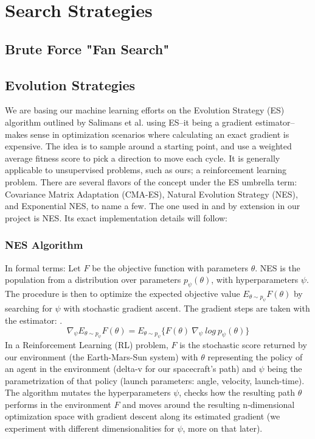 
\chapter{Search Strategies}

\section{Brute Force "Fan Search"}
\section{Evolution Strategies}
We are basing our machine learning efforts on the Evolution Strategy (ES) algorithm outlined by Salimans et al. \cite{Salimans2017} using ES--it being a gradient estimator--makes sense in optimization scenarios where calculating an exact gradient is expensive. The idea is to sample around a starting point, and use a weighted average fitness score to pick a direction to move each cycle. It is generally applicable to unsupervised problems, such as ours; a reinforcement learning problem. There are several flavors of the concept under the ES umbrella term: Covariance Matrix Adaptation (CMA-ES), Natural Evolution Strategy (NES), and Exponential NES, to name a few. The one used in \cite{Salimans2017} and by extension in our project is NES. Its exact implementation details will follow:

\subsection{NES Algorithm}
In formal terms: Let \(F\) be the objective function with parameters \(\theta\). NES is the population from a distribution over parameters \(p_\psi (\theta)\), with hyperparameters \(\psi\). The procedure is then to optimize the expected objective value \(E_{\theta \sim p_\psi} F(\theta)\) by searching for \(\psi\) with stochastic gradient ascent. The gradient steps are taken with the estimator: \cite{Salimans2017}.
\begin{equation}
    \nabla_\psi E_{\theta \sim p_\psi} F(\theta)
    = E_{\theta \sim p_\psi} \{F(\theta)~\nabla_\psi~log~p_\psi(\theta)\}
\end{equation}
In a Reinforcement Learning (RL) problem, \(F\) is the stochastic score returned by our environment (the Earth-Mars-Sun system) with \(\theta\) representing the policy of an agent in the environment (delta-v for our spacecraft's path) and \(\psi\) being the parametrization of that policy (launch parameters: angle, velocity, launch-time). The algorithm mutates the hyperparameters \(\psi\), checks how the resulting path \(\theta\) performs in the environment \(F\) and moves around the resulting n-dimensional optimization space with gradient descent along its estimated gradient (we experiment with different dimensionalities for \(\psi\), more on that later).
